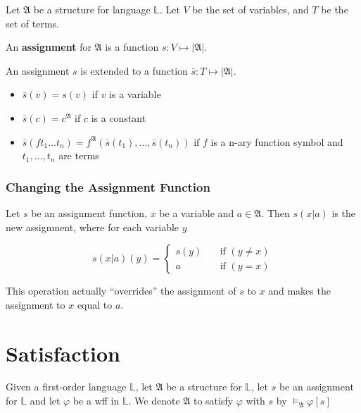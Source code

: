 Let $\mathfrak{A}$ be a structure for language $\mathbb{L}$. Let $V$ be the set of variables, and $T$ be the set of terms.

\begin{definition}
    An \textbf{assignment} for $\mathfrak{A}$ is a function $s:V\mapsto|\mathfrak{A}|$.
\end{definition}

\begin{definition}
    An assignment $s$ is extended to a function $\bar{s}:T\mapsto|\mathfrak{A}|$.
    \begin{itemize}
        \item $\bar{s}(v) = s(v)$ if $v$ is a variable
        \item $\bar{s}(c) = c^{\mathfrak{A}}$ if $c$ is a constant
        \item $\bar{s}(ft_1\dots t_n) = f^{\mathfrak{A}}(\bar{s}(t_1),\dots,\bar{s}(t_n))$ if $f$ is a n-ary function symbol and $t_1,\dots,t_n$ are terms
    \end{itemize}
\end{definition}

\subsubsection{Changing the Assignment Function}

Let $s$ be an assignment function, $x$ be a variable and $a\in\mathfrak{A}$. Then $s(x|a)$ is the new assignment, where for each variable $y$

\[s(x|a)(y) = \begin{cases}
    s(y) &\quad \text{if $(y\neq x)$}\\
    a &\quad \text{if $(y=x)$}
\end{cases}\]

This operation actually ``overrides'' the assignment of $s$ to $x$ and makes the assignment to $x$ equal to $a$.

\section{Satisfaction}

Given a first-order language $\mathbb{L}$, let $\mathfrak{A}$ be a structure for $\mathbb{L}$, let $s$ be an assignment for $\mathbb{L}$ and let $\varphi$ be a wff in $\mathbb{L}$. We denote $\mathfrak{A}$ to satisfy $\varphi$ with $s$ by $\vDash_{\mathfrak{A}}\varphi[s]$

